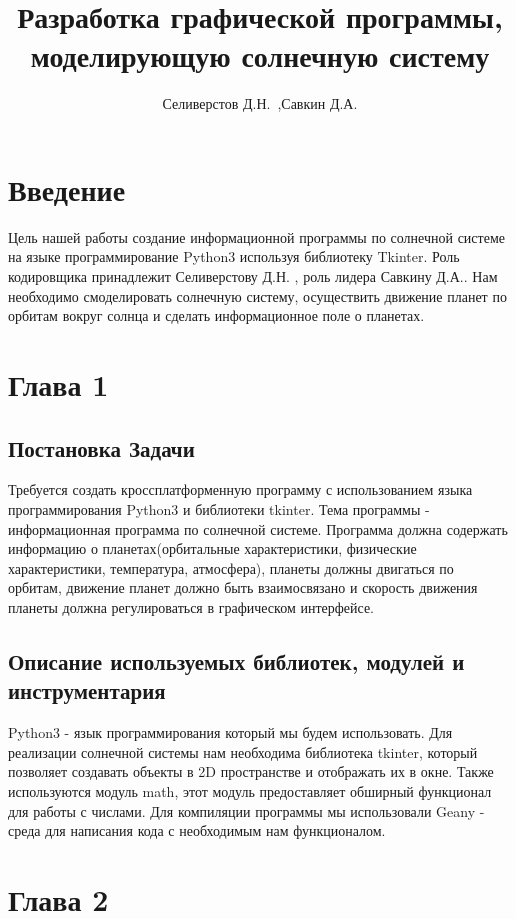 \documentclass[14pt, oneside]{SavkinSeliverstov}
\title{Разработка графической программы, моделирующую солнечную систему}
\author{Селиверстов Д.Н.\ ,Савкин Д.А.}
\institute{Институт цифровых технологий, электроники и физики}
\date{\the\year}
\begin{document}
\maketitle

\setcounter{page}{2}
\makeabstract
\tableofcontents

\chapter*{Введение}
Цель нашей работы  создание информационной программы по солнечной системе на языке программирование Python3 используя библиотеку Tkinter. Роль кодировщика принадлежит Селиверстову Д.Н. , роль лидера Савкину Д.А.. Нам необходимо смоделировать солнечную систему, осуществить движение планет по орбитам вокруг солнца и сделать информационное поле о планетах.


\chapter{Глава 1}
\section{Постановка Задачи}
Требуется создать кроссплатформенную программу с использованием языка программирования Python3 и библиотеки tkinter. Тема программы - информационная программа по солнечной системе. Программа должна содержать информацию о планетах(орбитальные характеристики, физические характеристики, температура, атмосфера), планеты должны двигаться по орбитам, движение планет должно быть взаимосвязано и скорость движения планеты должна регулироваться в графическом интерфейсе.
\section{Описание используемых библиотек, модулей и инструментария}
Python3 - язык программирования который мы будем использовать. Для реализации солнечной системы нам необходима библиотека tkinter, который позволяет создавать объекты в 2D пространстве и отображать их в окне. Также используются модуль math, этот модуль предоставляет обширный функционал для работы с числами. Для компиляции программы мы использовали Geany - среда для написания кода с необходимым нам функционалом.

\chapter{Глава 2}
\end{document}
